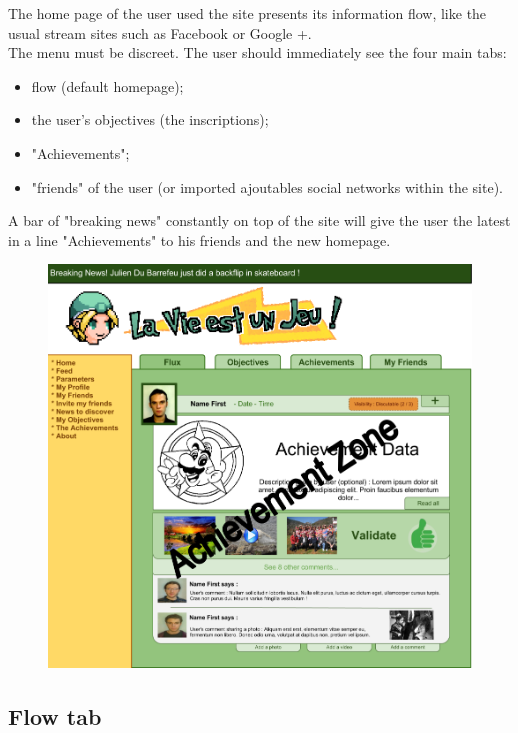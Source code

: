 \documentclass {life-en}
\begin{document}
The home page of the user used the site presents its information flow, like the usual stream sites such as Facebook or Google +. \\

The menu must be discreet. The user should immediately see the four main tabs:

\begin{itemize}
  \item flow (default homepage);
  \item the user's objectives (the inscriptions);
  \item "Achievements";
  \item "friends" of the user (or imported ajoutables social networks within the site).
\end{itemize}

A bar of "breaking news" constantly on top of the site will give the user the latest in a line "Achievements" to his friends and the new homepage.

\begin{figure} [H]
  \begin{center}
    \includegraphics [width = 15cm]{img/accueil.png}
  \end{center}
\end{figure}


\subsection{Flow tab}
\end{document}
